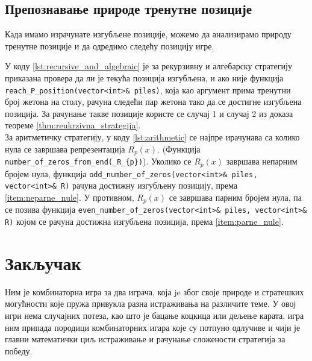 \documentclass[a4paper]{article}
\begin{document}
\subsection{Препознавање природе тренутне позиције}

Када имамо израчунате изгубљене позиције, можемо да анализирамо природу тренутне позиције и да одредимо следећу позицију игре.

У коду \ref{lst:recursive_and_algebraic} је за рекурзивну и алгебарску стратегију приказана провера да ли је текућа позиција изгубљена, и ако није функција \verb|reach_P_position(vector<int>& piles)|, која као аргумент прима тренутни број жетона на столу, рачуна следећи пар жетона тако да се достигне изгубљена позиција. За рачунање такве позиције користе се случај 1 и случај 2 из доказа теореме \ref{thm:reukrzivna_strategija}.\\
За аритметичку стратегију, у коду \ref{lst:arithmetic} се најпре ирачунава са колико нула се завршава репрезентација $ R_{p}(x) $. (Функција \verb|number_of_zeros_from_end(_R_{p})|). Уколико се $ R_{p}(x) $ завршава непарним бројем нула, функција \verb|odd_number_of_zeros(vector<int>& piles, vector<int>& R)| рачуна достижну изгубљену позицију, према \ref{item:neparne_nule}. У противном, $ R_{p}(x) $ се завршава парним бројем нула, па се позива функција \verb|even_number_of_zeros(vector<int>& piles, vector<int>& R)| којом се рачуна достижна изгубљена позиција, према \ref{item:parne_nule}.





\newpage

\section{Закључак}
\label{sec:zakljucak}

Ним је комбинаторна игра за два играча, која je због своје природе и стратешких могућности које пружа привукла разна истраживања на различите теме. У овој игри нема случајних потеза, као што је бацање коцкица или дељење карата, игра ним припада породици комбинаторних игара које су потпуно одлучиве и чији је главни математички циљ истраживање и рачунање сложености стратегија за победу.
\end{document}
